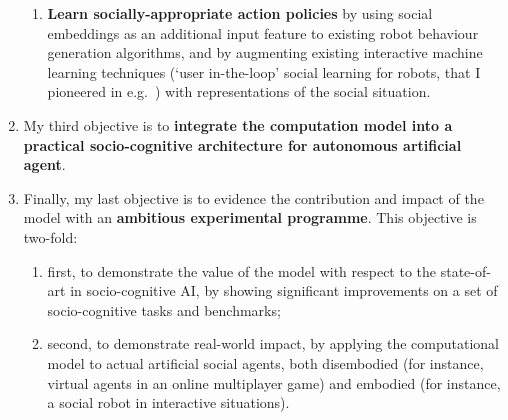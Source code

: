 \begin{enumerate}[label=\textbf{O\arabic*}]
\begin{enumerate}[label=\textbf{O2.\arabic*}]
        \item \label{O2.3} \textbf{Learn socially-appropriate action policies} by using
            social embeddings as an additional input feature to existing robot behaviour
            generation algorithms, and by augmenting existing interactive machine
            learning techniques (`user in-the-loop' social learning for robots, that I
            pioneered in e.g.~\cite{winkle2021leador}) with
            representations of the social situation.

    \end{enumerate}

    \item \label{_O3} My third objective is to {\bf integrate the \project computation model into a
        practical socio-cognitive architecture for autonomous artificial agent}. 

    \item \label{_O4} Finally, my last objective is to evidence the
        contribution and impact of the \project model with an {\bf ambitious
        experimental programme}.
        This objective is two-fold:

        \begin{enumerate}[label=\textbf{O4.\arabic*}]
            \item \label{O4.1} first, to demonstrate the value of the model
                with respect to the state-of-art in socio-cognitive AI, by
                showing significant improvements on a set of socio-cognitive
                tasks and benchmarks;
            \item \label{O4.2} second, to demonstrate real-world impact, by
                applying the \project computational model to actual artificial
                social agents, both disembodied (for instance, virtual agents in an online
                multiplayer game) and embodied (for instance, a social robot in
                interactive situations).
        \end{enumerate}
\end{enumerate}

\vspace{1.5em}

